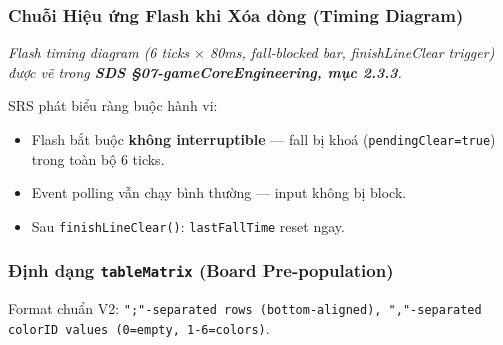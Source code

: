 \documentclass[12pt,a4paper]{article}
\begin{document}
\subsubsection{Chuỗi Hiệu ứng Flash khi Xóa dòng (Timing Diagram)}
\textit{Flash timing diagram (6 ticks $\times$ 80ms, fall-blocked bar,
finishLineClear trigger) được vẽ trong
\textbf{SDS §07-gameCoreEngineering, mục 2.3.3}.}

SRS phát biểu ràng buộc hành vi:
\begin{itemize}[nosep]
  \item Flash bắt buộc \textbf{không interruptible} --- fall bị khoá
        (\texttt{pendingClear=true}) trong toàn bộ 6 ticks.
  \item Event polling vẫn chạy bình thường --- input không bị block.
  \item Sau \texttt{finishLineClear()}: \texttt{lastFallTime} reset ngay.
\end{itemize}

\subsubsection{Định dạng \texttt{tableMatrix} (Board Pre-population)}

\noindent Format chuẩn V2: \foreignlanguage{english}{\texttt{";"-separated rows (bottom-aligned), ","-separated colorID values (0=empty, 1-6=colors)}}.

\begin{center}
\end{center}
\end{document}
